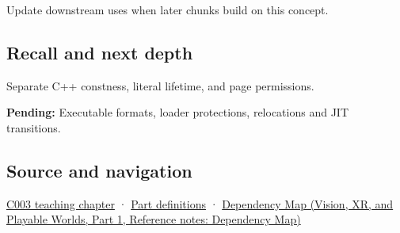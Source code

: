 \hypertarget{appendix-5f9e5e2f0a5e-used-by}{}

Update downstream uses when later chunks build on this concept.

\subsection{Recall and next depth}\label{appendix-5f9e5e2f0a5e-recall-and-next-depth}

\hypertarget{appendix-5f9e5e2f0a5e-recall-and-next-depth}{}

Separate C++ constness, literal lifetime, and page permissions.

\textbf{Pending:} Executable formats, loader protections, relocations and JIT transitions.

\subsection{Source and navigation}\label{appendix-5f9e5e2f0a5e-source-and-navigation}

\hypertarget{appendix-5f9e5e2f0a5e-source-and-navigation}{}

\hyperref[01-foundations-i-ch002-where-the-bytes-live]{C003 teaching chapter} · \hyperref[appendix-fd090d982a15-m003---parts-41-60]{Part definitions} · \href{../07-Vision-XR-and-Playable-Worlds-P01/main.pdf\#nameddest=appendix-4ad47bdd269a}{Dependency Map (Vision, XR, and Playable Worlds, Part 1, Reference notes: Dependency Map)}
